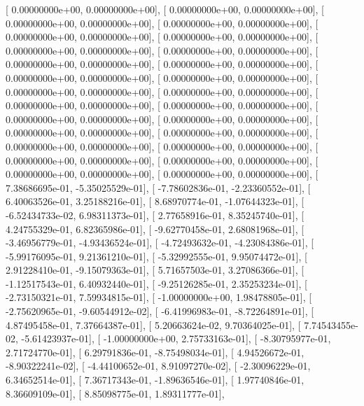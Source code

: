 \documentclass{article}
\begin{document}
       [  0.00000000e+00,   0.00000000e+00],
       [  0.00000000e+00,   0.00000000e+00],
       [  0.00000000e+00,   0.00000000e+00],
       [  0.00000000e+00,   0.00000000e+00],
       [  0.00000000e+00,   0.00000000e+00],
       [  0.00000000e+00,   0.00000000e+00],
       [  0.00000000e+00,   0.00000000e+00],
       [  0.00000000e+00,   0.00000000e+00],
       [  0.00000000e+00,   0.00000000e+00],
       [  0.00000000e+00,   0.00000000e+00],
       [  0.00000000e+00,   0.00000000e+00],
       [  0.00000000e+00,   0.00000000e+00],
       [  0.00000000e+00,   0.00000000e+00],
       [  0.00000000e+00,   0.00000000e+00],
       [  0.00000000e+00,   0.00000000e+00],
       [  0.00000000e+00,   0.00000000e+00],
       [  0.00000000e+00,   0.00000000e+00],
       [  0.00000000e+00,   0.00000000e+00],
       [  0.00000000e+00,   0.00000000e+00],
       [  0.00000000e+00,   0.00000000e+00],
       [  0.00000000e+00,   0.00000000e+00],
       [  0.00000000e+00,   0.00000000e+00],
       [  0.00000000e+00,   0.00000000e+00],
       [  0.00000000e+00,   0.00000000e+00],
       [  0.00000000e+00,   0.00000000e+00],
       [  0.00000000e+00,   0.00000000e+00],
       [  7.38686695e-01,  -5.35025529e-01],
       [ -7.78602836e-01,  -2.23360552e-01],
       [  6.40063526e-01,   3.25188216e-01],
       [  8.68970774e-01,  -1.07644323e-01],
       [ -6.52434733e-02,   6.98311373e-01],
       [  2.77658916e-01,   8.35245740e-01],
       [  4.24755329e-01,   6.82365986e-01],
       [ -9.62770458e-01,   2.68081968e-01],
       [ -3.46956779e-01,  -4.93436524e-01],
       [ -4.72493632e-01,  -4.23084386e-01],
       [ -5.99176095e-01,   9.21361210e-01],
       [ -5.32992555e-01,   9.95074472e-01],
       [  2.91228410e-01,  -9.15079363e-01],
       [  5.71657503e-01,   3.27086366e-01],
       [ -1.12517543e-01,   6.40932440e-01],
       [ -9.25126285e-01,   2.35253234e-01],
       [ -2.73150321e-01,   7.59934815e-01],
       [ -1.00000000e+00,   1.98478805e-01],
       [ -2.75620965e-01,  -9.60544912e-02],
       [ -6.41996983e-01,  -8.72264891e-01],
       [  4.87495458e-01,   7.37664387e-01],
       [  5.20663624e-02,   9.70364025e-01],
       [  7.74543455e-02,  -5.61423937e-01],
       [ -1.00000000e+00,   2.75733163e-01],
       [ -8.30795977e-01,   2.71724770e-01],
       [  6.29791836e-01,  -8.75498034e-01],
       [  4.94526672e-01,  -8.90322241e-02],
       [ -4.44100652e-01,   8.91097270e-02],
       [ -2.30096229e-01,   6.34652514e-01],
       [  7.36717343e-01,  -1.89636546e-01],
       [  1.97740846e-01,   8.36609109e-01],
       [  8.85098775e-01,   1.89311777e-01],
\end{document}
